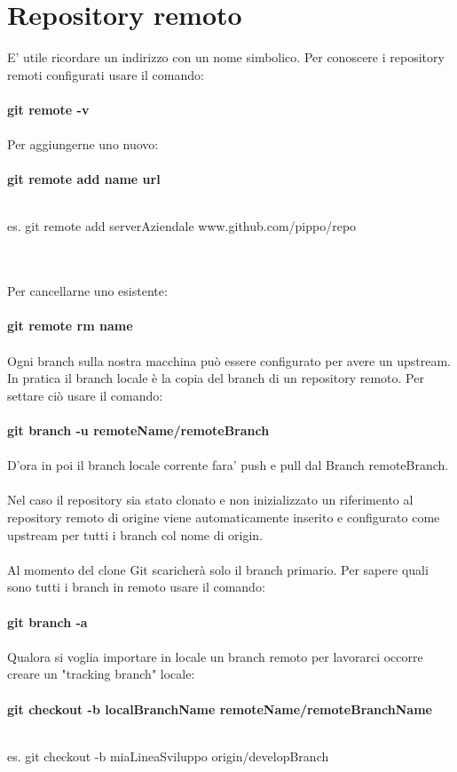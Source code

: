 \documentclass[a4paper,12pt]{report}
\begin{document}
\section{Repository remoto}
E' utile ricordare un indirizzo con un nome simbolico. 
Per conoscere i repository remoti configurati usare il comando:
\\\\
\textbf{git remote -v}
\\\\
Per aggiungerne uno nuovo:
\\\\
\textbf{git remote add name url}
\\\\
\centerline{es. git remote add serverAziendale www.github.com/pippo/repo}
\\\\
Per cancellarne uno esistente:
\\\\
\textbf{git remote rm name}
\\\\
Ogni branch sulla nostra macchina può essere configurato per avere un upstream. In pratica il branch locale è la copia del branch di un repository remoto.
Per settare ciò usare il comando:
\\\\
\textbf{git branch -u remoteName/remoteBranch}
\\\\
D'ora in poi il branch locale corrente fara' push e pull dal Branch remoteBranch.
\\\\
Nel caso il repository sia stato clonato e non inizializzato un riferimento al repository remoto di origine viene automaticamente inserito e configurato come upstream per tutti i branch col nome di origin.
\\\\
Al momento del clone Git scaricherà solo il branch primario.
Per sapere quali sono tutti i branch in remoto usare il comando:
\\\\
\textbf{git branch -a}
\\\\
Qualora si voglia importare in locale un branch remoto per lavorarci occorre creare un "tracking branch" locale:
\\\\
\textbf{git checkout -b localBranchName remoteName/remoteBranchName}
\\\\
\centerline{es. git checkout -b miaLineaSviluppo origin/developBranch}
\end{document}
